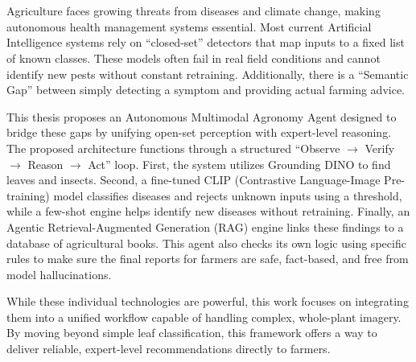 \documentclass[oneside,a4paper,12pt]{book}
\begin{document}
	\chapter*{}
	Agriculture faces growing threats from diseases and climate change, making autonomous health management systems essential. Most current Artificial Intelligence systems rely on ``closed-set'' detectors that map inputs to a fixed list of known classes. These models often fail in real field conditions and cannot identify new pests without constant retraining. Additionally, there is a ``Semantic Gap'' between simply detecting a symptom and providing actual farming advice.
	
	This thesis proposes an Autonomous Multimodal Agronomy Agent designed to bridge these gaps by unifying open-set perception with expert-level reasoning. The proposed architecture functions through a structured ``Observe $\rightarrow$ Verify $\rightarrow$ Reason  $\rightarrow$ Act'' loop. First, the system utilizes Grounding DINO\cite{liu2023grounding} to find leaves and insects. Second, a fine-tuned CLIP\cite{radford2021learning} (Contrastive Language-Image Pre-training) model classifies diseases and rejects unknown inputs using a threshold, while a few-shot engine helps identify new diseases without retraining. Finally, an Agentic Retrieval-Augmented Generation (RAG) engine links these findings to a database of agricultural books. This agent also checks its own logic using specific rules to make sure the final reports for farmers are safe, fact-based, and free from model hallucinations.
	
	While these individual technologies are powerful, this work focuses on integrating them into a unified workflow capable of handling complex, whole-plant imagery. By moving beyond simple leaf classification, this framework offers a way to deliver reliable, expert-level recommendations directly to farmers.
	
	\tableofcontents
	\listoffigures
	\listoftables
	\mainmatter
	\pagestyle{myfancy}
	\begingroup
	
	
	
	
%	
	
	
	
	
	\pagestyle{plain}
	
	
	
\end{document}

